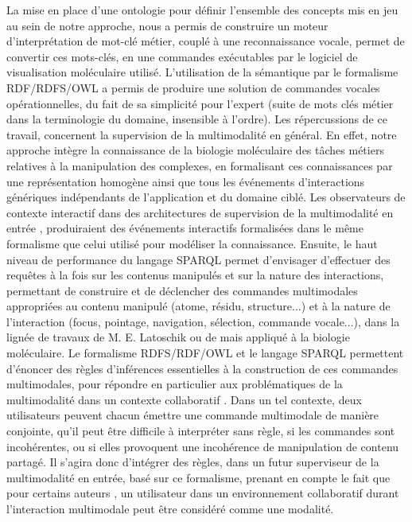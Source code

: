 La mise en place d'une ontologie pour définir l'ensemble des concepts mis en jeu au sein de notre approche, nous a permis de construire un moteur d'interprétation de mot-clé métier, couplé à une reconnaissance vocale, permet de convertir ces mots-clés, en une commandes exécutables par le logiciel de visualisation moléculaire utilisé. L'utilisation de la sémantique par le formalisme RDF/RDFS/OWL a permis de produire une solution de commandes vocales opérationnelles, du fait de sa simplicité pour l'expert (suite de mots clés métier dans la terminologie du domaine, insensible à l'ordre). Les répercussions de ce travail, concernent la supervision de la multimodalité en général. En effet, notre approche intègre la connaissance de la biologie moléculaire des tâches métiers relatives à la manipulation des complexes, en formalisant ces connaissances par une représentation homogène ainsi que tous les événements d'interactions génériques indépendants de l'application et du domaine ciblé. Les observateurs de contexte interactif dans des architectures de supervision de la multimodalité en entrée \cite{martin2014hardware}, produiraient des événements interactifs formalisées dans le même formalisme que celui utilisé pour modéliser la connaissance. Ensuite, le haut niveau de performance du langage SPARQL permet d'envisager d'effectuer des requêtes à la fois sur les contenus manipulés et sur la nature des interactions, permettant de construire et de déclencher des commandes multimodales appropriées au contenu manipulé (atome, résidu, structure...) et à la nature de l'interaction (focus, pointage, navigation, sélection, commande vocale...), dans la lignée de travaux de M. E. Latoschik \cite{Wiebusch:2015aa} ou de \cite{gutierrez2005semantics} mais appliqué à la biologie moléculaire. Le formalisme RDFS/RDF/OWL et le langage SPARQL permettent d'énoncer des règles d'inférences essentielles à la construction de ces commandes multimodales, pour répondre en particulier aux problématiques de la multimodalité dans un contexte collaboratif \cite{martin2014hardware}.
Dans un tel contexte, deux utilisateurs peuvent chacun émettre une commande multimodale de manière conjointe, qu'il peut être difficile à interpréter sans règle, si les commandes sont incohérentes, ou si elles provoquent une incohérence de manipulation de contenu partagé. Il s'agira donc d'intégrer des règles, dans un futur superviseur de la multimodalité en entrée, basé sur ce formalisme, prenant en compte le fait que pour certains auteurs \cite{martin2014hardware}, un utilisateur dans un environnement collaboratif durant l'interaction multimodale peut être considéré comme une modalité.


